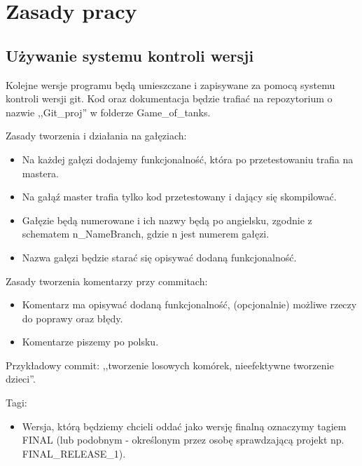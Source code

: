 \documentclass{article}
\begin{document}
\section{Zasady pracy}

\subsection{Używanie systemu kontroli wersji}
Kolejne wersje programu będą umieszczane i zapisywane za pomocą systemu kontroli wersji git. Kod oraz dokumentacja będzie trafiać na repozytorium o nazwie ,,Git\_proj'' w folderze Game\_of\_tanks. \\

\par Zasady tworzenia i działania na gałęziach:
\begin{itemize}
    \item Na każdej gałęzi dodajemy funkcjonalność, która po przetestowaniu trafia na mastera.
    \item Na gałąź master trafia tylko kod przetestowany i dający się skompilować.
    \item Gałęzie będą numerowane i ich nazwy będą po angielsku, zgodnie z schematem n\_NameBranch, gdzie n jest numerem gałęzi.
    \item Nazwa gałęzi będzie starać się opisywać dodaną funkcjonalność.
    
\end{itemize}

\par Zasady tworzenia komentarzy przy commitach:
\begin{itemize}
    \item Komentarz ma opisywać dodaną funkcjonalność, (opcjonalnie) możliwe rzeczy do poprawy oraz błędy.
    \item Komentarze piszemy po polsku.
\end{itemize}
Przykładowy commit: ,,tworzenie losowych komórek, nieefektywne tworzenie dzieci''. \\

\par Tagi:
\begin{itemize}
    \item Wersja, którą będziemy chcieli oddać jako wersję finalną oznaczymy tagiem FINAL (lub podobnym - określonym przez osobę sprawdzającą projekt np. FINAL\_RELEASE\_1).
\end{itemize}
\end{document}
